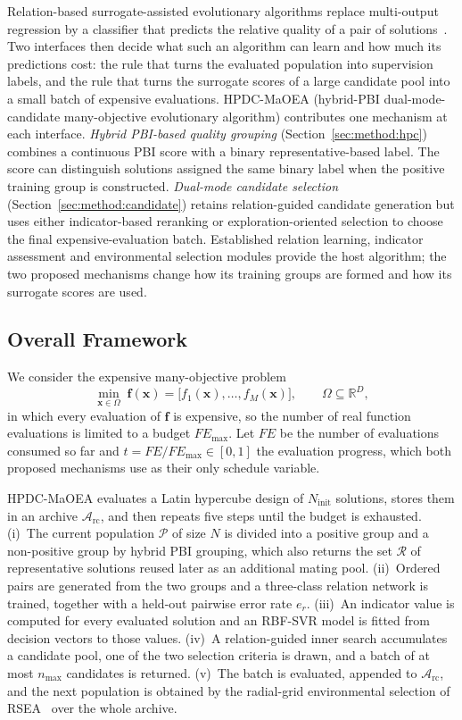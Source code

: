 \documentclass[final,5p,times,twocolumn]{elsarticle}
\newcommand{\vf}{\mathbf{f}}
\newcommand{\vx}{\mathbf{x}}
\begin{document}
Relation-based surrogate-assisted evolutionary algorithms replace multi-output
regression by a classifier that predicts the relative quality of a pair of
solutions~\cite{ref:remo}. Two interfaces then decide what such an algorithm
can learn and how much its predictions cost: the rule that turns the evaluated
population into supervision labels, and the rule that turns the surrogate
scores of a large candidate pool into a small batch of expensive evaluations.
HPDC-MaOEA (hybrid-PBI dual-mode-candidate many-objective evolutionary
algorithm) contributes one mechanism at each interface. \emph{Hybrid PBI-based
quality grouping} (Section~\ref{sec:method:hpc}) combines a continuous PBI
score with a binary representative-based label. The score can distinguish
solutions assigned the same binary label when the positive training group is
constructed. \emph{Dual-mode candidate selection}
(Section~\ref{sec:method:candidate}) retains relation-guided candidate
generation but uses either indicator-based reranking or exploration-oriented
selection to choose the final expensive-evaluation batch. Established relation
learning, indicator assessment and environmental selection modules provide the
host algorithm; the two proposed mechanisms change how its training groups are
formed and how its surrogate scores are used.

\subsection{Overall Framework}
\label{sec:method:framework}

We consider the expensive many-objective problem
\begin{equation}
\min_{\vx\in\Omega}\;
\vf(\vx)=\bigl[f_1(\vx),\ldots,f_M(\vx)\bigr],
\qquad
\Omega\subseteq\mathbb{R}^{D},
\label{eq:problem}
\end{equation}
in which every evaluation of $\vf$ is expensive, so the number of real function
evaluations is limited to a budget $FE_{\max}$. Let $FE$ be the number of
evaluations consumed so far and $t=FE/FE_{\max}\in[0,1]$ the evaluation
progress, which both proposed mechanisms use as their only schedule variable.

HPDC-MaOEA evaluates a Latin hypercube design of $N_{\mathrm{init}}$ solutions,
stores them in an archive $\mathcal{A}_{\mathrm{rc}}$, and then repeats five
steps until the budget is exhausted. (i)~The current population $\mathcal{P}$
of size $N$ is divided into a positive group and a non-positive group by
hybrid PBI grouping, which also returns the set $\mathcal{R}$ of
representative solutions reused later as an additional mating pool.
(ii)~Ordered pairs are generated from the two groups and a three-class relation
network is trained, together with a held-out pairwise error rate $e_r$.
(iii)~An indicator value is computed for every evaluated solution and an
RBF-SVR model is fitted from decision vectors to those values.
(iv)~A relation-guided inner search accumulates a candidate pool, one of the
two selection criteria is drawn, and a batch of at most $n_{\max}$ candidates is
returned. (v)~The batch is evaluated, appended to
$\mathcal{A}_{\mathrm{rc}}$, and the next population is obtained by the
radial-grid environmental selection of RSEA~\cite{ref:rsea} over the whole
archive.
\end{document}
